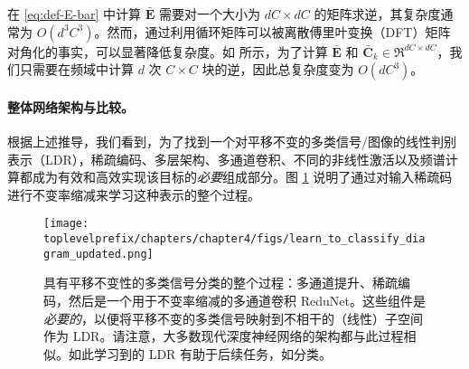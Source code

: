 \documentclass[../../book-main_zh.tex]{subfiles}
\begin{document}
\begin{remark}[在频域中降低计算复杂性]
在 \eqref{eq:def-E-bar} 中计算 $\bar{\bm E}$ 需要对一个大小为 $dC \times dC$ 的矩阵求逆，其复杂度通常为 $O(d^3C^3)$。然而，通过利用循环矩阵可以被离散傅里叶变换（DFT）矩阵对角化的事实，可以显著降低复杂度。如 \cite{chan2021redunet} 所示，为了计算 $\bar{\bm E}$ 和 $\bar{\bm C}_k \in \Re^{dC \times dC}$，我们只需要在频域中计算 $d$ 次 $C\times C$ 块的逆，因此总复杂度变为 $O(dC^3)$。

\end{remark}




\paragraph{整体网络架构与比较。}
根据上述推导，我们看到，为了找到一个对平移不变的多类信号/图像的线性判别表示（LDR），稀疏编码、多层架构、多通道卷积、不同的非线性激活以及频谱计算都成为有效和高效实现该目标的{\em 必要}组成部分。图 \ref{fig:learn-to-classify-diagram} 说明了通过对输入稀疏码进行不变率缩减来学习这种表示的整个过程。

\begin{figure}[t]
    \centering
    \texttt{[image: \\toplevelprefix/chapters/chapter4/figs/learn\_to\_classify\_diagram\_updated.png]}
    \caption{具有平移不变性的多类信号分类的整个过程：多通道提升、稀疏编码，然后是一个用于不变率缩减的多通道卷积 ReduNet。这些组件是{\em 必要的}，以便将平移不变的多类信号映射到不相干的（线性）子空间作为 LDR。请注意，大多数现代深度神经网络的架构都与此过程相似。如此学习到的 LDR 有助于后续任务，如分类。}
    \label{fig:learn-to-classify-diagram}
\end{figure}

\end{document}
